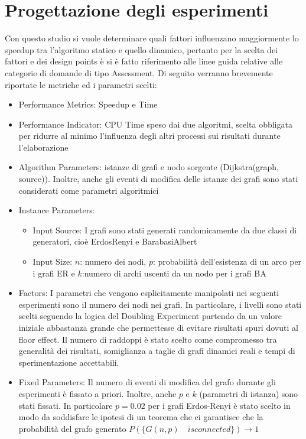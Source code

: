\documentclass[a4paper]{article}
\begin{document}
\section{Progettazione degli esperimenti}
Con questo studio si vuole determinare quali fattori influenzano maggiormente lo speedup tra l'algoritmo statico e quello dinamico, pertanto per la scelta dei fattori e dei design points è si è fatto riferimento alle linee guida relative alle categorie di domande di tipo Assessment.
Di seguito verranno brevemente riportate le metriche ed i parametri scelti:
\begin{itemize}
\item Performance Metrics: Speedup e Time
\item Performance Indicator: CPU Time speso dai due algoritmi, scelta obbligata per ridurre al minimo l'influenza degli altri processi sui risultati durante l'elaborazione
\item Algorithm Parameters: istanze di grafi e nodo sorgente (Dijkstra(graph, source)). Inoltre, anche gli eventi di modifica delle istanze dei grafi sono stati considerati come parametri algoritmici
\item Instance Parameters: 
\begin{itemize}
\item Input Source: I grafi sono stati generati randomicamente da due classi di generatori, cioè ErdosRenyi e BarabasiAlbert
\item Input Size: $n$: numero dei nodi, $p$: probabilità dell'esistenza di un arco per i grafi ER e $k$:numero di archi uscenti da un nodo per i grafi BA
\end{itemize}
\item Factors: I parametri che vengono esplicitamente manipolati nei seguenti esperimenti sono
il numero dei nodi nei grafi. In particolare, i livelli sono stati scelti seguendo la logica del Doubling Experiment partendo da un valore iniziale abbastanza grande che permettesse di evitare risultati spuri dovuti al floor effect. Il numero di raddoppi è stato scelto come compromesso tra generalità dei risultati, somiglianza a taglie di grafi dinamici reali e tempi di sperimentazione accettabili.
\item Fixed Parameters: Il numero di eventi di modifica del grafo durante gli esperimenti è fissato a priori. Inoltre, anche $p$ e $k$ (parametri di istanza) sono stati fissati. In particolare $p=0.02$ per i grafi Erdos-Renyi è stato scelto in modo da soddisfare le ipotesi di un teorema che ci garantisce che la probabilità del grafo generato $P(\{G(n,p) \quad is connected\})\rightarrow 1$

\end{itemize}
\end{document}
